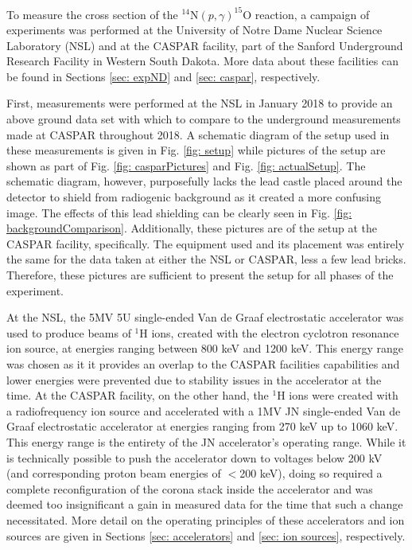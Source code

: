 To measure the cross section of the $^{14}$N$\left( p,\gamma \right) ^{15}$O reaction, a campaign of experiments was performed at the University of Notre Dame Nuclear Science Laboratory (NSL) and at the CASPAR facility, part of the Sanford Underground Research Facility in Western South Dakota. More data about these facilities can be found in Sections \ref{sec: expND} and \ref{sec: caspar}, respectively. 

First, measurements were performed at the NSL in January 2018 to provide an above ground data set with which to compare to the underground measurements made at CASPAR throughout 2018. A schematic diagram of the setup used in these measurements is given in Fig. \ref{fig: setup} while pictures of the setup are shown as part of Fig. \ref{fig: casparPictures} and Fig. \ref{fig: actualSetup}. The schematic diagram, however, purposefully lacks the lead castle placed around the detector to shield from radiogenic background as it created a more confusing image. The effects of this lead shielding can be clearly seen in Fig. \ref{fig: backgroundComparison}. Additionally, these pictures are of the setup at the CASPAR facility, specifically. The equipment used and its placement was entirely the same for the data taken at either the NSL or CASPAR, less a few lead bricks. Therefore, these pictures are sufficient to present the setup for all phases of the experiment. 

At the NSL, the 5MV 5U single-ended Van de Graaf electrostatic accelerator was used to produce beams of $^{1}$H ions, created with the electron cyclotron resonance ion source, at energies ranging between 800 keV and 1200 keV. This energy range was chosen as it it provides an overlap to the CASPAR facilities capabilities and lower energies were prevented due to stability issues in the accelerator at the time. At the CASPAR facility, on the other hand, the $^{1}$H ions were created with a radiofrequency ion source and accelerated with a 1MV JN single-ended Van de Graaf electrostatic accelerator at energies ranging from 270 keV up to 1060 keV. This energy range is the entirety of the JN accelerator's operating range. While it is technically possible to push the accelerator down to voltages below 200 kV (and corresponding proton beam energies of $<$200 keV), doing so required a complete reconfiguration of the corona stack inside the accelerator and was deemed too insignificant a gain in measured data for the time that such a change necessitated. More detail on the operating principles of these accelerators and ion sources are given in Sections \ref{sec: accelerators} and \ref{sec: ion sources}, respectively. 

